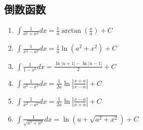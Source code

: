 \documentclass[10pt, a4paper, twocolumn]{article}
\begin{document}
\subsection{倒数函数}
\begin{enumerate}
    \item $\int \frac{1}{a^2+x^2} dx = \frac{1}{a} \arctan\left(\frac{x}{a}\right) + C$
    \item $\int \frac{1}{x^2-a^2} dx = \frac{1}{a} \ln(a^2+x^2) + C$
    \item $\int \frac{1}{1-x^2} dx = \frac{\ln|u+1|-\ln|u-1|}{2} + C$
    \item $\int \frac{1}{a^2-x^2} dx = \frac{1}{2a} \ln\left|\frac{x+a}{x-a}\right| + C$
    \item $\int \frac{1}{x^2-a^2} dx = \frac{1}{2a} \ln\left|\frac{x-a}{x+a}\right| + C$
    \item $\int \frac{1}{\sqrt{a^2+u^2}} dx = \ln(u+\sqrt{a^2+x^2}) + C$
\end{enumerate}
\end{document}
